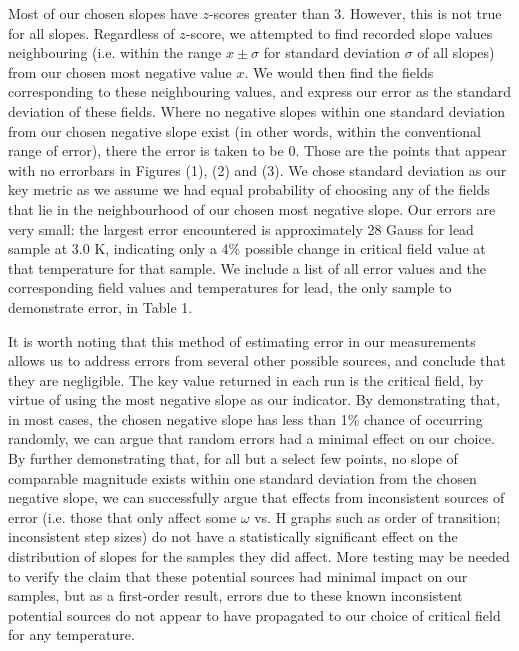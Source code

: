 \documentclass[aps,prl,nofootinbib,twocolumn,superscriptaddress,groupedaddress]{revtex4}  %
\begin{document}
Most of our chosen slopes have $z$-scores greater than 3. However, this is not true for all slopes. Regardless of $z$-score, we attempted to find recorded slope values neighbouring (i.e. within the range $x \pm \sigma$ for standard deviation $\sigma$ of all slopes) from our chosen most negative value $x$. We would then find the fields corresponding to these neighbouring values, and express our error as the standard deviation of these fields. Where no negative slopes within one standard deviation from our chosen negative slope exist (in other words, within the conventional range of error), there the error is taken to be 0. Those are the points that appear with no errorbars in Figures (1), (2) and (3). We chose standard deviation as our key metric as we assume we had equal probability of choosing any of the fields that lie in the neighbourhood of our chosen most negative slope. Our errors are very small: the largest error encountered is approximately 28 Gauss for lead sample at 3.0 K, indicating only a 4\% possible change in critical field value at that temperature for that sample. We include a list of all error values and the corresponding field values and temperatures for lead, the only sample to demonstrate error, in Table 1. 

It is worth noting that this method of estimating error in our measurements allows us to address errors from several other possible sources, and conclude that they are negligible. The key value returned in each run is the critical field, by virtue of using the most negative slope as our indicator. By demonstrating that, in most cases, the chosen negative slope has less than 1\% chance of occurring randomly, we can argue that random errors had a minimal effect on our choice. By further demonstrating that, for all but a select few points, no slope of comparable magnitude exists within one standard deviation from the chosen negative slope, we can successfully argue that effects from inconsistent sources of error (i.e. those that only affect some $\omega$ vs. H graphs such as order of transition; inconsistent step sizes) do not have a statistically significant effect on the distribution of slopes for the samples they did affect. More testing may be needed to verify the claim that these potential sources had minimal impact on our samples, but as a first-order result, errors due to these known inconsistent potential sources do not appear to have propagated to our choice of critical field for any temperature. 
\end{document}
